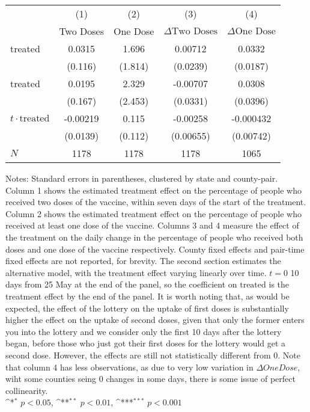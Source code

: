 \begin{minipage}{6.25in}
	\centering
	\def\sym#1{\ifmmode^{#1}\else\(^{#1}\)\fi}
	\begin{tabular*}{\textwidth}{@{\extracolsep{\fill}} l*{4}{c}}
	\hline\hline
	            &\multicolumn{1}{c}{(1)}&\multicolumn{1}{c}{(2)}&\multicolumn{1}{c}{(3)}&\multicolumn{1}{c}{(4)}\\
	            &\multicolumn{1}{c}{Two Doses}&\multicolumn{1}{c}{One Dose}&\multicolumn{1}{c}{$\Delta \textrm{Two Doses}$}&\multicolumn{1}{c}{$\Delta \textrm{One Dose}$}\\
	\hline
	treated     &      0.0315         &       1.696         &     0.00712         &      0.0332         \\
	            &     (0.116)         &     (1.814)         &    (0.0239)         &    (0.0187)         \\
	\hline
	treated&0.0195&2.329&-0.00707&0.0308\\
	&(0.167)&(2.453)&(0.0331)&(0.0396)\\
	$t\cdot\textrm{treated}$&-0.00219&0.115&-0.00258&-0.000432\\
	&(0.0139)&(0.112)&(0.00655)&(0.00742)\\
	\hline
	\(N\)       &        1178         &        1178         &        1178         &        1065         \\
	\hline\hline
	\end{tabular*}
	\caption*{\footnotesize{Notes: Standard errors in parentheses, clustered by state and county-pair. Column 1 shows the estimated treatment effect on the percentage of people who received two doses of the vaccine, within seven days of the start of the treatment. Column 2 shows the estimated treatment effect on the percentage of people who received at least one dose of the vaccine. Columns 3 and 4 measure the effect of the treatment on the daily change in the percentage of people who received both doses and one dose of the vaccine respectively. County fixed effects and pair-time fixed effects are not reported, for brevity. The second section estimates the alternative model, with the treatment effect varying linearly over time. $t=0$ 10 days from 25 May at the end of the panel, so the coefficient on $\textrm{treated}$ is the treatment effect by the end of the panel. It is worth noting that, as would be expected, the effect of the lottery on the uptake of first doses is substantially higher the effect on the uptake of second doses, given that only the former enters you into the lottery and we consider only the first 10 days after the lottery began, before those who just got their first doses for the lottery would get a second dose. However, the effects are still not statistically different from 0. Note that column 4 has less observations, as due to very low variation in $\Delta One Dose$, wiht some counties seing 0 changes in some days, there is some issue of perfect collinearity.\\
		\sym{*} \(p<0.05\), \sym{**} \(p<0.01\), \sym{***} \(p<0.001\)}}
\end{minipage}

